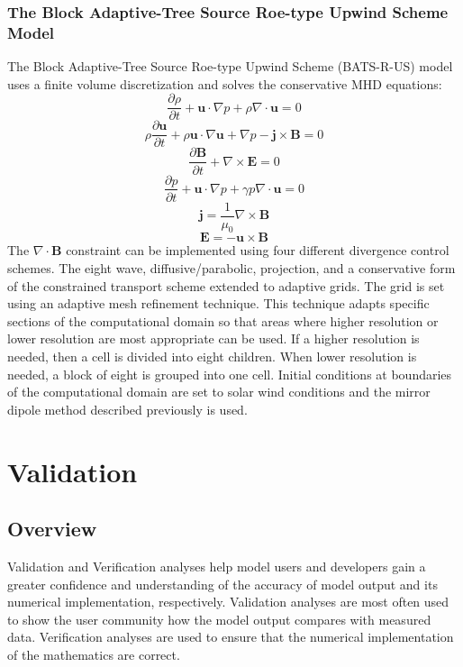 \subsection{The Block Adaptive-Tree Source Roe-type Upwind Scheme Model}
The Block Adaptive-Tree Source Roe-type Upwind Scheme (BATS-R-US) model uses a
finite volume discretization and solves the conservative MHD equations:
$$ \frac{\partial \rho}{\partial t} + \mathbf{u} \cdot \nabla p + \rho\nabla
\cdot \mathbf{u} = 0 $$ $$ \rho \frac{\partial \mathbf{u}}{\partial t} + \rho
\mathbf{u} \cdot \nabla \mathbf{u} +  \nabla p - \mathbf{j} \times \mathbf{B} =
0 $$ $$ \frac{\partial \mathbf{B}}{\partial t} + \nabla \times \mathbf{E} = 0 $$
$$ \frac{\partial p}{\partial t} + \mathbf{u} \cdot \nabla p + \gamma p \nabla
\cdot \mathbf{u} = 0 $$ $$ \mathbf{j} = \frac{1}{\mu_0} \nabla \times \mathbf{B}
$$ $$ \mathbf{E} = -\mathbf{u} \times \mathbf{B} $$ The $\nabla \cdot
\mathbf{B}$ constraint can be implemented using four different divergence
control schemes. The eight wave, diffusive/parabolic, projection, and a conservative
form of the constrained transport scheme extended to adaptive grids.
The grid is set using an adaptive mesh refinement technique. This
technique adapts specific sections of the computational domain so that areas
where higher resolution or lower resolution are most appropriate can be used.
If a higher resolution is needed, then a cell is divided into eight children.
When lower resolution is needed, a block of eight is
grouped into one cell. Initial conditions at boundaries of the computational
domain are set to solar wind conditions and the mirror dipole method described previously is used.


\chapter{Validation}
\section{Overview}
Validation and Verification analyses help model users and developers gain a
greater confidence and understanding of the accuracy of model output and its numerical
implementation, respectively. Validation analyses are most often used to show
the user community how the model output compares with measured data.
Verification analyses are used to ensure that the numerical implementation of
the mathematics are correct.

